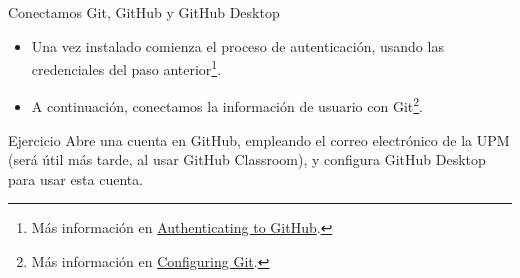 \documentclass[xcolor={usenames,svgnames,dvipsnames}]{beamer}
\begin{document}
\begin{frame}[label={sec:org81b8195}]{Conectamos Git, GitHub y GitHub Desktop}
\begin{itemize}
\item Una vez instalado comienza el proceso de autenticación, usando las credenciales del paso anterior\footnote{Más información en \href{https://help.github.com/desktop/guides/getting-started-with-github-desktop/authenticating-to-github/}{Authenticating to GitHub}.}.
\end{itemize}

\begin{center}
\end{center}


\begin{itemize}
\item A continuación, conectamos la información de usuario con Git\footnote{Más información en \href{https://help.github.com/desktop/guides/getting-started-with-github-desktop/configuring-git-for-github-desktop/}{Configuring Git}.}.
\end{itemize}

\begin{center}
\end{center}
\end{frame}

\begin{frame}[label={sec:org07d0ae3}]{}
\begin{block}{Ejercicio}
Abre una cuenta en GitHub, empleando el correo electrónico de la UPM (será útil más tarde, al usar GitHub Classroom), y configura GitHub Desktop para usar esta cuenta.
\end{block}
\end{frame}
\end{document}

